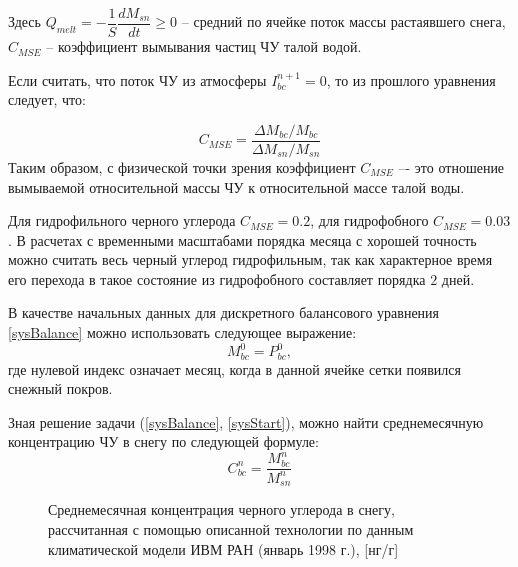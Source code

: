 \documentclass[a4paper, fontsize=14pt]{scrartcl}
\begin{document}
Здесь $Q_{melt} = - \dfrac{1}{S} \dfrac{dM_{sn}}{dt} \geq 0$ --  средний по ячейке поток массы растаявшего снега, $C_{MSE}$ -- коэффициент вымывания частиц ЧУ талой водой. 

Если считать, что поток ЧУ из атмосферы $I_{bc}^{n + 1} = 0$, то из прошлого уравнения следует, что:

\begin{equation}
   C_{MSE} = \dfrac{\Delta M_{bc} / M_{bc}}{\Delta M_{sn} / M_{sn}}     \label{sys}
\end{equation}
Таким образом, с физической точки зрения коэффициент $C_{MSE}$ –- это отношение вымываемой относительной массы ЧУ к относительной массе талой воды. 

Для гидрофильного черного углерода $C_{MSE} = 0.2$, для гидрофобного $C_{MSE} = 0.03$ \cite{Flanner2007, Conway1996}. В расчетах с временными масштабами порядка месяца с хорошей точность можно считать весь черный углерод гидрофильным, так как характерное время его перехода в такое состояние из гидрофобного составляет порядка $2$ дней.

В качестве начальных данных для дискретного балансового уравнения \eqref{sysBalance} можно использовать следующее выражение:
\begin{equation}
    M_{bc}^0 = P_{bc}^0, \label{sysStart}
\end{equation}
где нулевой индекс означает месяц, когда в данной ячейке сетки появился снежный покров. 

Зная решение задачи (\eqref{sysBalance}, \eqref{sysStart}), можно найти среднемесячную концентрацию ЧУ в снегу по следующей формуле:
\begin{equation}
   C_{bc}^n = \dfrac{M_{bc}^n}{M_{sn}^n}  \label{sys}
\end{equation}

\begin{figure}[h]
    \caption{Среднемесячная концентрация черного углерода в снегу, рассчитанная с помощью описанной технологии по данным климатической модели ИВМ РАН (январь 1998 г.), [нг/г]}
    \label{fig:image}
\end{figure}
\end{document}
